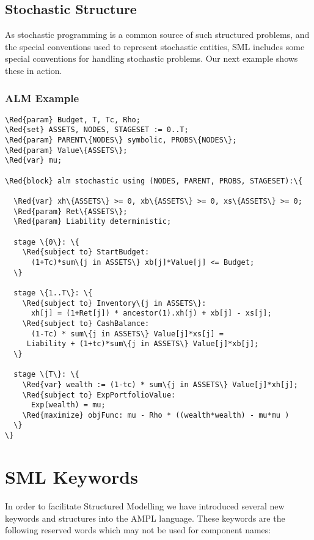 \documentclass[10pt,a4paper]{report}
\begin{document}
\section{Stochastic Structure}

As stochastic programming is a common source of such structured problems, and
the special conventions used to represent stochastic entities, SML includes
some special conventions for handling stochastic problems. Our next example
shows these in action.

\subsection{ALM Example}

\begin{Verbatim}[frame=single,framerule=0.2pt,framesep=5pt,commandchars=\\\{\}]
\Red{param} Budget, T, Tc, Rho;
\Red{set} ASSETS, NODES, STAGESET := 0..T;
\Red{param} PARENT\{NODES\} symbolic, PROBS\{NODES\};
\Red{param} Value\{ASSETS\};
\Red{var} mu;

\Red{block} alm stochastic using (NODES, PARENT, PROBS, STAGESET):\{

  \Red{var} xh\{ASSETS\} >= 0, xb\{ASSETS\} >= 0, xs\{ASSETS\} >= 0;
  \Red{param} Ret\{ASSETS\};
  \Red{param} Liability deterministic;

  stage \{0\}: \{
    \Red{subject to} StartBudget:
      (1+Tc)*sum\{j in ASSETS\} xb[j]*Value[j] <= Budget;
  \}

  stage \{1..T\}: \{
    \Red{subject to} Inventory\{j in ASSETS\}:
      xh[j] = (1+Ret[j]) * ancestor(1).xh(j) + xb[j] - xs[j];
    \Red{subject to} CashBalance:
      (1-Tc) * sum\{j in ASSETS\} Value[j]*xs[j] = 
	 Liability + (1+tc)*sum\{j in ASSETS\} Value[j]*xb[j];
  \}

  stage \{T\}: \{
    \Red{var} wealth := (1-tc) * sum\{j in ASSETS\} Value[j]*xh[j];
    \Red{subject to} ExpPortfolioValue:
      Exp(wealth) = mu;
    \Red{maximize} objFunc: mu - Rho * ((wealth*wealth) - mu*mu )
  \}
\}
\end{Verbatim}

\chapter{SML Keywords}

In order to facilitate Structured Modelling we have introduced several new
keywords and structures into the AMPL language. These keywords are the
following reserved words which may not be used for component names:
\end{document}
